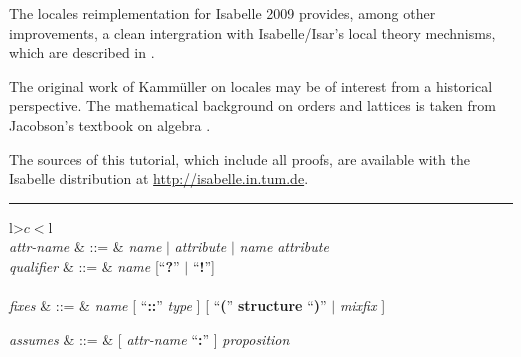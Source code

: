 \begin{isabellebody}
\begin{isamarkuptext}
  The locales reimplementation for Isabelle 2009 provides, among other
  improvements, a clean intergration with Isabelle/Isar's local theory
  mechnisms, which are described in \cite{HaftmannWenzel2009}.

  The original work of Kamm\"uller on locales \cite{KammullerEtAl1999}
  may be of interest from a historical perspective.  The mathematical
  background on orders and lattices is taken from Jacobson's textbook
  on algebra \cite[Chapter~8]{Jacobson1985}.

  The sources of this tutorial, which include all proofs, are
  available with the Isabelle distribution at
  \url{http://isabelle.in.tum.de}.%
\end{isamarkuptext}%
\isamarkuptrue%
%
\begin{isamarkuptext}%
\begin{table}
\hrule
\vspace{2ex}
\begin{center}
\begin{tabular}{l>$c<$l}
   \\

  \textit{attr-name} & ::=
  & \textit{name} $|$ \textit{attribute} $|$
    \textit{name} \textit{attribute} \\
  \textit{qualifier} & ::=
  & \textit{name} [``\textbf{?}'' $|$ ``\textbf{!}''] \\[2ex]

   \\

  \textit{fixes} & ::=
  & \textit{name} [ ``\textbf{::}'' \textit{type} ]
    [ ``\textbf{(}'' \textbf{structure} ``\textbf{)}'' $|$
    \textit{mixfix} ] \\
\begin{comment}
  \textit{constrains} & ::=
  & \textit{name} ``\textbf{::}'' \textit{type} \\
\end{comment}
  \textit{assumes} & ::=
  & [ \textit{attr-name} ``\textbf{:}'' ] \textit{proposition} \\
\begin{comment}
  \textit{defines} & ::=
  & [ \textit{attr-name} ``\textbf{:}'' ] \textit{proposition} \\
  \textit{notes} & ::=
  & [ \textit{attr-name} ``\textbf{=}'' ]
    ( \textit{qualified-name} [ \textit{attribute} ] )$^+$ \\
\end{comment}


\end{tabular}
\end{center}
\end{table}
\end{isamarkuptext}
\end{isabellebody}
